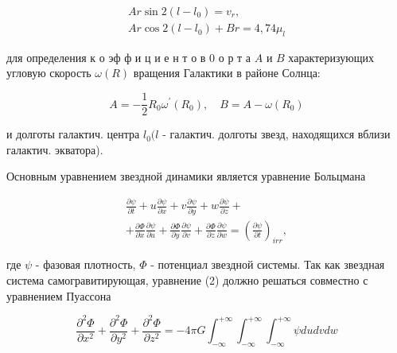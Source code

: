 \documentclass[10pt]{article}
\begin{document}
\[

\begin{gathered}

A r \sin 2\left(l-l_{0}\right)=v_{r}, \\

A r \cos 2\left(l-l_{0}\right)+B r=4,74 \mu_{l}

\end{gathered}

\]



для определения к о эф ф и ц и е н т о в 0 о р т а $A$ и $B$ характеризующих угловую скорость $\omega(R)$ вращения Галактики в районе Солнца:



\[

A=-\frac{1}{2} R_{0} \omega^{\prime}\left(R_{0}\right), \quad B=A-\omega\left(R_{0}\right)

\]



и долготы галактич. центра $l_{0}(l$ - галактич. долготы звезд, находящихся вблизи галактич. экватора).



Основным уравнением звездной динамики является уравнение Больцмана



\[

\begin{gathered}

\frac{\partial \psi}{\partial t}+u \frac{\partial \psi}{\partial x}+v \frac{\partial \psi}{\partial y}+w \frac{\partial \psi}{\partial z}+ \\

+\frac{\partial \Phi}{\partial x} \frac{\partial \psi}{\partial u}+\frac{\partial \Phi}{\partial y} \frac{\partial \psi}{\partial v}+\frac{\partial \Phi}{\partial z} \frac{\partial \psi}{\partial w}=\left(\frac{\partial \psi}{\partial t}\right)_{i r r},

\end{gathered}

\]



где $\psi$ - фазовая плотность, $\Phi$ - потенциал звездной системы. Так как звездная система самогравитирующая, уравнение (2) должно решаться совместно с уравнением Пуассона



\[

\frac{\partial^{2} \Phi}{\partial x^{2}}+\frac{\partial^{2} \Phi}{\partial y^{2}}+\frac{\partial^{2} \Phi}{\partial z^{2}}=-4 \pi G \int_{-\infty}^{+\infty} \int_{-\infty}^{+\infty} \int_{-\infty}^{+\infty} \psi d u d v d w

\]
\end{document}
